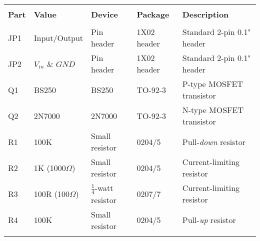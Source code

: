 \begin{tabular}{lllll}
\hline\\[\negsep]
\textbf{Part} & \textbf{Value} & \textbf{Device} & \textbf{Package} & \textbf{Description} \\[\sep]
\hline\\[\negsep]
JP1  &  Input/Output & Pin header    & 1X02 header     & Standard 2-pin 0.1" header \\[\sep]
JP2  &  $V_{in}$ \& $GND$ & Pin header & 1X02 header     & Standard 2-pin 0.1" header \\[\sep]
Q1   &  BS250       &  BS250         & TO-92-3     & P-type MOSFET transistor \\[\sep]
Q2   &  2N7000      & 2N7000         & TO-92-3     & N-type MOSFET transistor \\[\sep]
R1   &  100K        & Small resistor & 0204/5    & Pull-\emph{down} resistor \\[\sep]
R2   &  1K (1000$\Omega$)         & Small resistor & 0204/5    & Current-limiting resistor \\[\sep]
R3   &  100R (100$\Omega$) & $\frac{1}{4}$-watt resistor & 0207/7 & Current-limiting resistor \\[\sep]
R4   &  100K       & Small resistor & 0204/5    & Pull-\emph{up} resistor \\[\sep]
\hline\\
\end{tabular}
